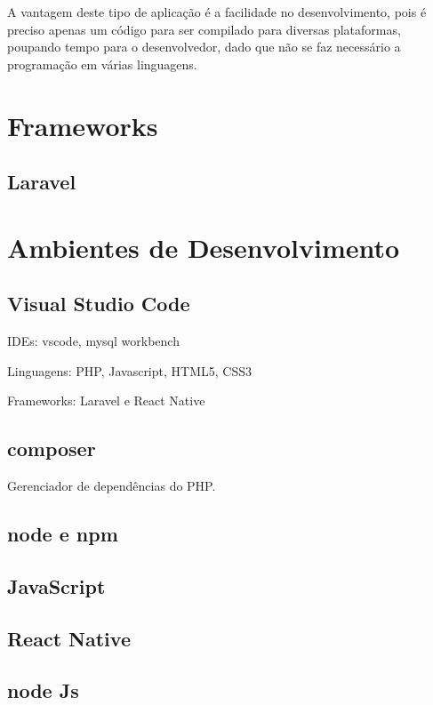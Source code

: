 		A vantagem deste tipo de aplicação é a facilidade no desenvolvimento, pois é preciso apenas um código para ser compilado para diversas plataformas, poupando tempo para o  desenvolvedor, dado que não se faz necessário a programação em várias linguagens.
	
\section{Frameworks}


	\subsection{Laravel}
	
		
	
\section{Ambientes de Desenvolvimento}
	
	\subsection{Visual Studio Code}
	
	IDEs: vscode, mysql workbench
	
	Linguagens: PHP, Javascript, HTML5, CSS3
	
	Frameworks: Laravel e React Native

	\subsection{composer}
	Gerenciador de dependências do PHP.
	
	\subsection{node e npm}
	
		\subsection{JavaScript}
	
	\subsection{React Native} %
	\subsection{node Js} 
 










